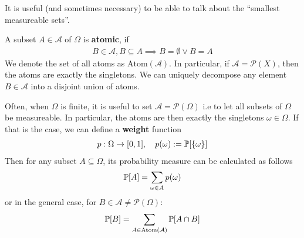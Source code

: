 It is useful (and sometimes necessary) to be able to talk about the ``smallest measureable sets''.
\begin{dfn}[]
A subset $A \in \mathcal{A}$ of $\Omega$ is \textbf{atomic}, if 
\begin{align*}
  B \in \mathcal{A}, B \subseteq A \implies B = \emptyset \lor B = A
\end{align*}
We denote the set of all atoms as $\text{Atom}(\mathcal{A})$. 
In particular, if $\mathcal{A} = \mathcal{P}(X)$, then the atoms are exactly the singletons.
We can uniquely decompose any element $B \in \mathcal{A}$ into a disjoint union of atoms.

\end{dfn}

\begin{rem}[]
  Often, when $\Omega$ is finite, it is useful to set $\mathcal{A} = \mathcal{P}(\Omega)$ i.e to let all subsets of $\Omega$ be measureable. In particular, the atoms are then exactly the singletons $\omega \in \Omega$. If that is the case, we can define a \textbf{weight} function
\begin{align*}
  p: \Omega \to [0,1], \quad p(\omega) := \mathbb{P}[\{\omega\}]
\end{align*}
  Then for any subset $A \subseteq \Omega$, its probability measure can be calculated as follows
  \begin{align*}
    \mathbb{P}[A] = \sum_{\omega \in A}p(\omega)
  \end{align*}
  or in the general case, for $B \in \mathcal{A} \neq \mathcal{P}(\Omega)$:
  \begin{align*}
    \mathbb{P}[B] = \sum_{A \in \text{Atom}(\mathcal{A})} \mathbb{P}[A \cap B]
  \end{align*}
\end{rem}

